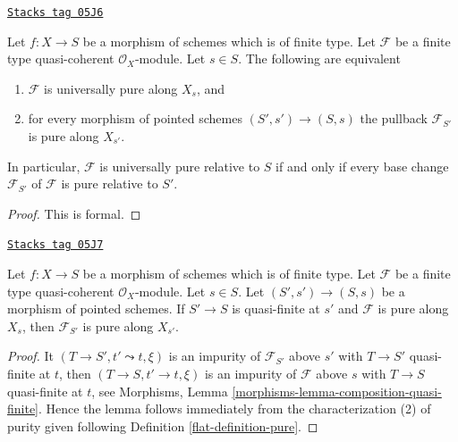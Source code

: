 \begin{lemma}
\label{flat-lemma-base-change-universally}
\href{https://stacks.math.columbia.edu/tag/05J6}{\texttt{Stacks tag 05J6}}

Let $f : X \to S$ be a morphism of schemes which is of finite type.
Let $\mathcal{F}$ be a finite type quasi-coherent $\mathcal{O}_X$-module.
Let $s \in S$. The following are equivalent
\begin{enumerate}
\item $\mathcal{F}$ is universally pure along $X_s$, and
\item for every morphism of pointed schemes $(S', s') \to (S, s)$
the pullback $\mathcal{F}_{S'}$ is pure along $X_{s'}$.
\end{enumerate}
In particular, $\mathcal{F}$ is universally pure relative to $S$ if and
only if every base change $\mathcal{F}_{S'}$ of $\mathcal{F}$ is
pure relative to $S'$.
\end{lemma}

\begin{proof}
This is formal.
\end{proof}

\begin{lemma}
\label{flat-lemma-quasi-finite-base-change}
\href{https://stacks.math.columbia.edu/tag/05J7}{\texttt{Stacks tag 05J7}}

Let $f : X \to S$ be a morphism of schemes which is of finite type.
Let $\mathcal{F}$ be a finite type quasi-coherent $\mathcal{O}_X$-module.
Let $s \in S$. Let $(S', s') \to (S, s)$ be a morphism of pointed schemes.
If $S' \to S$ is quasi-finite at $s'$ and $\mathcal{F}$ is pure along $X_s$,
then $\mathcal{F}_{S'}$ is pure along $X_{s'}$.
\end{lemma}

\begin{proof}

It $(T \to S', t' \leadsto t, \xi)$ is an impurity of
$\mathcal{F}_{S'}$ above $s'$ with $T \to S'$ quasi-finite at $t$,
then $(T \to S, t' \to t, \xi)$ is an impurity of $\mathcal{F}$
above $s$ with $T \to S$ quasi-finite at $t$, see
Morphisms, Lemma \ref{morphisms-lemma-composition-quasi-finite}.
Hence the lemma follows immediately from the characterization (2)
of purity given following
Definition \ref{flat-definition-pure}.
\end{proof}

